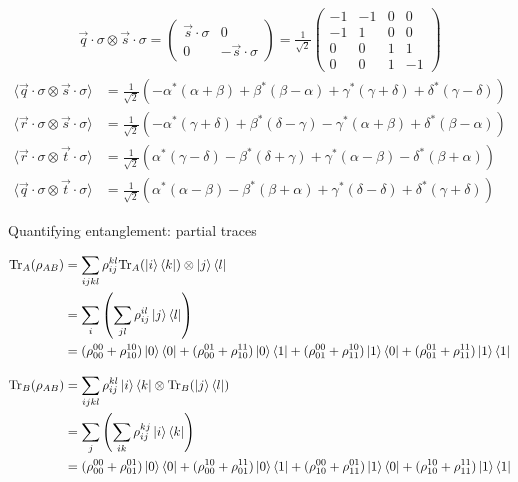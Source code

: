 \documentclass[aspectratio=1610]{beamer}					%
\begin{document}
\begin{frame}
\begin{align*}
\vec{q}\cdot\sigma\otimes\vec{s}\cdot\sigma = 
\begin{pmatrix}
\vec{s}\cdot\sigma & 0 \\
0 & -\vec{s}\cdot\sigma
\end{pmatrix} = 
\frac{1}{\sqrt{2}}\begin{pmatrix}
-1 & -1 & 0 & 0\\
-1 & 1 & 0 & 0\\
0 & 0 & 1 & 1 \\
0 & 0 & 1 & -1
\end{pmatrix}
\end{align*}
\begin{align*}
\langle \vec{q}\cdot\sigma\otimes\vec{s}\cdot\sigma\rangle &= \frac{1}{\sqrt{2}}\left(-\alpha^{*}(\alpha+\beta) + \beta^{*}(\beta-\alpha) + \gamma^{*}(\gamma+\delta) + \delta^{*}(\gamma-\delta)\right)\\
\langle \vec{r}\cdot\sigma\otimes\vec{s}\cdot\sigma\rangle &= \frac{1}{\sqrt{2}}\left(-\alpha^{*}(\gamma+\delta) + \beta^{*}(\delta-\gamma) - \gamma^{*}(\alpha + \beta) + \delta^{*}(\beta-\alpha)\right)\\
\langle \vec{r}\cdot\sigma\otimes\vec{t}\cdot\sigma\rangle &= \frac{1}{\sqrt{2}}\left(\alpha^{*}(\gamma-\delta) - \beta^{*}(\delta+\gamma) + \gamma^{*}(\alpha - \beta) - \delta^{*}(\beta+\alpha)\right)\\
\langle \vec{q}\cdot\sigma\otimes\vec{t}\cdot\sigma\rangle &= \frac{1}{\sqrt{2}}\left(\alpha^{*}(\alpha-\beta) - \beta^{*}(\beta+\alpha) + \gamma^{*}(\delta-\delta) + \delta^{*}(\gamma+\delta)\right)
\end{align*}
\end{frame}


\begin{frame}{Quantifying entanglement: partial traces}

\begin{align*}
\mathrm{Tr}_{A}(\rho_{AB}) &= \sum_{ijkl} \rho_{ij}^{kl} \mathrm{Tr}_{A}(\ket{i}\bra{k}) \otimes \ket{j}\bra{l}\\
&= \sum_{i} \left(\sum_{jl} \rho_{ij}^{il} \ket{j}\bra{l}\right)\\
&= (\rho_{00}^{00}+\rho_{10}^{10})\ket{0}\bra{0} + (\rho_{00}^{01}+\rho_{10}^{11})\ket{0}\bra{1} + (\rho_{01}^{00}+\rho_{11}^{10})\ket{1}\bra{0} + (\rho_{01}^{01}+\rho_{11}^{11})\ket{1}\bra{1}
\end{align*}

\begin{align*}
\mathrm{Tr}_{B}(\rho_{AB}) &= \sum_{ijkl} \rho_{ij}^{kl} \ket{i}\bra{k} \otimes \mathrm{Tr}_{B}(\ket{j}\bra{l})\\
&= \sum_{j} \left(\sum_{ik} \rho_{ij}^{kj} \ket{i}\bra{k}\right)\\
&= (\rho_{00}^{00}+\rho_{01}^{01})\ket{0}\bra{0} + (\rho_{00}^{10}+\rho_{01}^{11})\ket{0}\bra{1} + (\rho_{10}^{00}+\rho_{11}^{01})\ket{1}\bra{0} + (\rho_{10}^{10}+\rho_{11}^{11})\ket{1}\bra{1}
\end{align*}

\end{frame}
\end{document}
